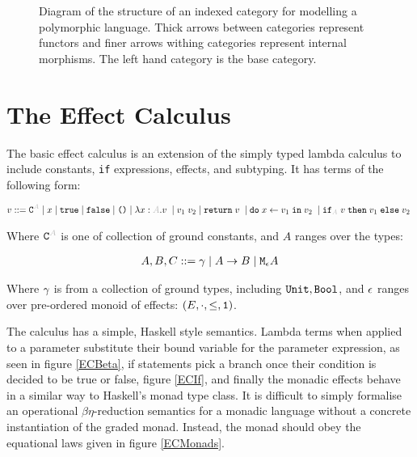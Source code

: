 \documentclass{Report}
\begin{document}
\begin{figure}[h!]
    \caption{Diagram of the structure of an indexed category for modelling a polymorphic language. Thick arrows between categories represent functors and finer arrows withing categories represent internal morphisms. The left hand category is the base category.
    }
    \label{IndexDiagram}
\end{figure}


\section{The Effect Calculus}

The basic effect calculus is an extension of the simply typed lambda calculus to include constants, \texttt{if} expressions, effects, and subtyping. It has terms of the following form:

\begin{align*}
    v ::= \const{A} \mid x\mid \t \mid\f \mid\u\mid\lam{x}{A}{v}\mid\apply{v_1}{v_2}\mid\return{v}\mid\doin{x}{v_1}{v_2}\mid\pifthenelse{A}{v}{v_1}{v_2} 
\end{align*}

Where $\const{A}$ is one of collection of ground constants, and $A$ ranges over the types:

\begin{align*}
    A, B, C ::= \gamma\mid A\rightarrow B \mid\texttt{M}_{\epsilon}{A}
\end{align*}

Where $\gamma$ is from a collection of ground types, including $\texttt{Unit}, \texttt{Bool}$, and $\epsilon$ ranges over pre-ordered monoid of effects: $(E, \cdot, \leq, \texttt{1})$.

The calculus has a simple, Haskell style semantics. Lambda terms when applied to a parameter substitute their bound variable for the parameter expression, as seen in figure \ref{ECBeta}, if statements pick a branch once their condition is decided to be true or false, figure \ref{ECIf}, and finally the monadic effects behave in a similar way to Haskell's monad type class. It is difficult to simply formalise an operational $\beta\eta$-reduction semantics for a monadic language without a concrete instantiation of the graded monad. Instead, the monad should obey the equational laws given in figure \ref{ECMonads}.
\end{document}
